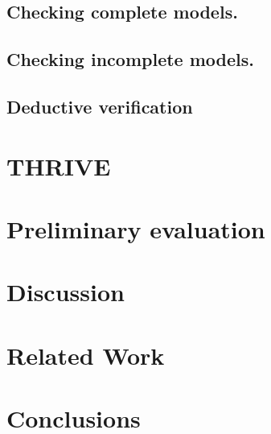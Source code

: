 \documentclass[runningheads,a4paper]{llncs}
\newcommand{\NAME}{THRIVE}
\begin{document}
\subsection{Checking complete models.}
\label{sec:mcComplete}


\subsection{Checking incomplete models.}
\label{sec:mcIncomplete}


\subsection{Deductive verification}
\label{sec:theoremProving}


\section{\NAME}
\label{sec:contribution}


%

\section{Preliminary evaluation}
\label{sec:preliminaryEvaluation}


\section{Discussion}
\label{sec:discussion}


\section{Related Work}
\label{sec:stateoftheart}



\section{Conclusions}
\label{sec:conclusions}



 


\end{document}
